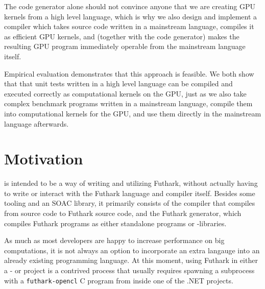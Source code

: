 The code generator alone should not convince anyone that we are creating GPU
kernels from a high level language, which is why we also design and implement a
compiler which takes source code written in a mainstream language, compiles it
as efficient GPU kernels, and (together with the code generator) makes the
resulting GPU program immediately operable from the mainstream language itself.  

Empirical evaluation demonstrates that this approach is feasible.
We both show that that unit tests written in a high level language can be compiled and executed
correctly as computational kernels on the GPU, just as we also take complex
benchmark programs written in a mainstream language, compile them into
computational kernels for the GPU, and use them directly in the mainstream
language afterwards.































\section*{Motivation}
\fshark{} is intended to be a way of writing and utilizing Futhark, without
actually having to write or interact with the Futhark language and compiler
itself. Besides some tooling and an \fsharp{} SOAC library, it primarily consists of the \fshark{} compiler that compiles from
\fsharp{} source code to Futhark source code, and the Futhark \csharp{}
generator, which compiles Futhark programs as either standalone \csharp{}
programs or -libraries.

As much as most developers are happy to increase performance on big
computations, it is not always an option to incorporate an extra langauge into
an already existing programming language. At this moment, using Futhark in
either a \csharp{}- or \fsharp{} project is a contrived process that usually
requires spawning a subprocess with a \texttt{futhark-opencl} C program from inside one of the .NET
projects.

